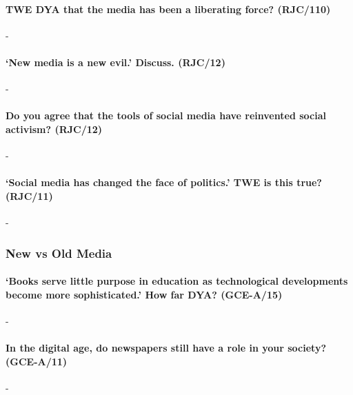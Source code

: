 \documentclass[../../main]{subfiles}
\begin{document}
\paragraph{TWE DYA that the media has been a liberating force? (RJC/110)}-


\paragraph{`New media is a new evil.' Discuss. (RJC/12)}-


\paragraph{Do you agree that the tools of social media have reinvented social activism? (RJC/12)}-

\paragraph{`Social media has changed the face of politics.' TWE is this true? (RJC/11)}-


\subsubsection{New vs Old Media}

\paragraph{`Books serve little purpose in education as technological developments become more sophisticated.' How far DYA? (GCE-A/15)}-

\paragraph{In the digital age, do newspapers still have a role in your society? (GCE-A/11)}-
\end{document}
